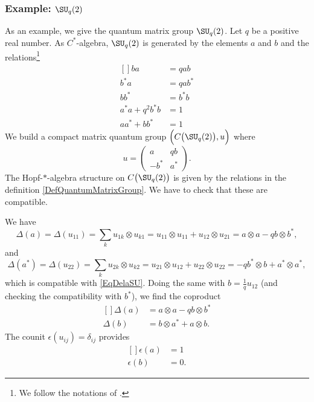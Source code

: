 \subsubsection{Example: \texorpdfstring{$\SU_q(2)$}{SU2}}

As an example, we give the quantum matrix group $\SU_q(2)$. Let $q$ be a positive real number. As $C^*$-algebra, $\SU_q(2)$ is generated by the elements $a$ and $b$ and the relations\footnote{We follow the notations of \cite{DiracSUq}.}
\begin{equation}        \label{EqDefAlfSUab}
    \begin{aligned}[]
        ba&=qab     \\  b^*a&=qab^*\\
        bb^*&=b^*b  \\  a^*a+q^2b^*b&=1\\
        aa^*+bb^*&=1
    \end{aligned}
\end{equation}
We build a compact matrix quantum group $\Big( C\big( \SU_q(2) \big),u \Big)$ where
\begin{equation}
    u=\begin{pmatrix}
        a   &   qb  \\ 
        -b^*    &   a^* 
    \end{pmatrix}.
\end{equation}
The Hopf-$*$-algebra structure on $C\big( \SU_q(2) \big)$ is given by the relations in the definition \ref{DefQuantumMatrixGroup}. We have to check that these are compatible. 

We have
\begin{equation}        \label{EqDelaSU}
    \Delta(a)=\Delta(u_{11})=\sum_k u_{1k}\otimes u_{k1}=u_{11}\otimes u_{11}+u_{12}\otimes u_{21}=a\otimes a-qb\otimes b^*,
\end{equation}
and
\begin{equation}
    \Delta(a^*)=\Delta(u_{22})=\sum_k u_{2k}\otimes u_{k2}=u_{21}\otimes u_{12}+u_{22}\otimes u_{22}=-qb^*\otimes b+a^*\otimes a^*,
\end{equation}
which is compatible with \eqref{EqDelaSU}. Doing the same with $b=\frac{1}{ q }u_{12}$ (and checking the compatibility with $b^*$), we find the coproduct
\begin{equation}
    \begin{aligned}[]
        \Delta(a)&=a\otimes a-qb\otimes b^*\\
        \Delta(b)&=b\otimes a^*+a\otimes b.
    \end{aligned}
\end{equation}
The counit $\epsilon(u_{ij})=\delta_{ij}$ provides
\begin{equation}
    \begin{aligned}[]
        \epsilon(a)&=1\\
        \epsilon(b)&=0.
    \end{aligned}
\end{equation}

